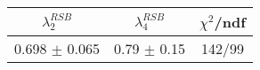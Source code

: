 \begin{tabular}{c|c||c}
$\lambda_{2}^{RSB}$ & $\lambda_4^{RSB}$ & $\chi^{2}$/ndf \\
\hline
0.698 $\pm$ 0.065 & 0.79 $\pm$ 0.15 & 142/99\\
\end{tabular}
